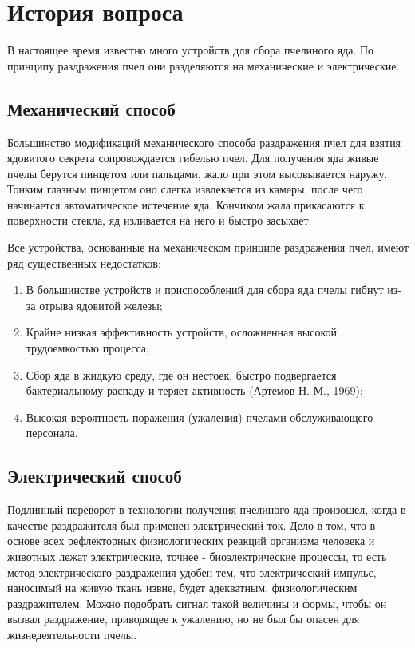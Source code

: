 \section{История вопроса}

В настоящее время известно много устройств для сбора пчелиного яда. По принципу раздражения пчел они разделяются на механические и электрические.

\subsection*{Механический способ}

Большинство модификаций механического способа раздражения пчел для взятия ядовитого секрета сопровождается гибелью пчел. Для получения яда живые пчелы берутся пинцетом или пальцами, жало при этом высовывается наружу. Тонким глазным пинцетом оно слегка извлекается из камеры, после чего начинается автомати­ческое истечение яда. Кончиком жала прикасаются к поверхности стекла, яд изливается на него и быстро засыхает.

Все устройства, основанные на механическом принципе раздра­жения пчел, имеют ряд существенных недостатков:
\begin{enumerate}
	\item В большинстве устройств и приспособлений для сбора яда пчелы гибнут из-за отрыва ядовитой железы; 
	\item Крайне низкая эффективность устройств, осложненная высо­кой трудоемкостью процесса;
	\item Сбор яда в жидкую среду, где он нестоек, быстро подвергает­ся бактериальному распаду и теряет активность (Артемов Н. М., 1969);
	\item Высокая вероятность поражения (ужаления) пчелами обслужи­вающего персонала.
\end{enumerate}

\subsection*{Электрический способ}

Подлинный переворот в технологии получения пчелиного яда произошел, когда в качестве раздражителя был применен электрический ток. Дело в том, что в основе всех рефлекторных физиологических реакций организма человека и животных лежат электрические, точнее - биоэлектрические процессы, то есть метод электрического раздражения удобен тем, что электрический импульс, наносимый на живую ткань извне, будет адекватным, физиологическим раздражителем. Можно подобрать сигнал такой величины и формы, чтобы он вызвал раздражение, приводящее к ужалению, но не был бы опасен для жизнедеятельности пчелы.


